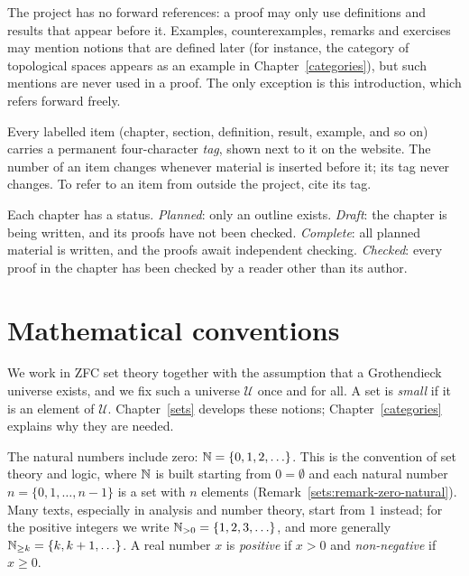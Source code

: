 \begin{remark}\label{introduction:remark-no-forward-references}
The project has no forward references: a proof may only use definitions and
results that appear before it. Examples, counterexamples, remarks and
exercises may mention notions that are defined later (for instance, the
category of topological spaces appears as an example in
Chapter~\ref{categories}), but such mentions are never used in a proof. The
only exception is this introduction, which refers forward freely.
\end{remark}

\begin{remark}\label{introduction:remark-tags}
Every labelled item (chapter, section, definition, result, example, and so on)
carries a permanent four-character \emph{tag}, shown next to it on the
website. The number of an item changes whenever material is inserted before
it; its tag never changes. To refer to an item from outside the project, cite
its tag.
\end{remark}

\begin{remark}\label{introduction:remark-status}
Each chapter has a status. \emph{Planned}: only an outline exists.
\emph{Draft}: the chapter is being written, and its proofs have not been
checked. \emph{Complete}: all planned material is written, and the proofs
await independent checking. \emph{Checked}: every proof in the chapter has been
checked by a reader other than its author.
\end{remark}

\section{Mathematical conventions}\label{introduction:section-mathematical-conventions}

\begin{notation}\label{introduction:notation-universe}
We work in ZFC set theory together with the assumption that a Grothendieck
universe exists, and we fix such a universe $\mathcal{U}$ once and for all. A
set is \emph{small} if it is an element of $\mathcal{U}$. Chapter~\ref{sets}
develops these notions; Chapter~\ref{categories} explains why they are needed.
\end{notation}

\begin{notation}\label{introduction:notation-numbers}
The natural numbers include zero: $\mathbb{N} = \{0, 1, 2, \ldots\}$. This is the
convention of set theory and logic, where $\mathbb{N}$ is built starting from
$0 = \emptyset$ and each natural number $n = \{0, 1, \ldots, n - 1\}$ is a set with
$n$ elements (Remark~\ref{sets:remark-zero-natural}). Many texts, especially in
analysis and number theory, start from $1$ instead; for the positive integers we
write $\mathbb{N}_{>0} = \{1, 2, 3, \ldots\}$, and more generally
$\mathbb{N}_{\geq k} = \{k, k + 1, \ldots\}$. A real number $x$ is \emph{positive} if
$x > 0$ and \emph{non-negative} if $x \geq 0$.
\end{notation}

